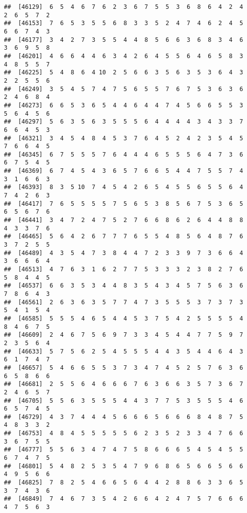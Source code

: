 \documentclass[
]{book}
\begin{document}
\begin{verbatim}
##  [46129]  6  5  4  6  7  6  2  3  6  7  5  5  3  6  8  6  4  2  4  2  6  5  7  2
##  [46153]  7  6  5  3  5  5  6  8  3  3  5  2  4  7  4  6  2  4  5  6  6  7  4  3
##  [46177]  3  4  2  7  3  5  5  4  4  8  5  6  6  3  6  8  3  4  6  3  6  9  5  8
##  [46201]  4  6  6  4  4  6  3  4  2  6  4  5  5  6  4  6  5  8  3  4  8  5  5  7
##  [46225]  5  4  8  6  4 10  2  5  6  6  3  5  6  3  5  3  6  4  3  2  2  5  5  6
##  [46249]  3  5  4  5  7  4  7  5  6  5  5  7  6  7  5  3  6  3  6  2  4  6  8  4
##  [46273]  6  6  5  3  6  5  4  4  6  4  4  7  4  5  6  6  5  5  3  5  6  4  5  6
##  [46297]  5  6  3  5  6  3  5  5  5  6  4  4  4  4  3  4  3  3  7  6  6  4  5  3
##  [46321]  3  4  5  4  8  4  5  3  7  6  4  5  2  4  2  3  5  4  5  7  6  6  4  5
##  [46345]  6  7  5  5  5  7  6  4  4  4  6  5  5  5  6  4  7  3  6  6  7  5  4  5
##  [46369]  6  7  4  5  4  3  6  5  7  6  6  5  4  4  7  5  5  7  4  3  1  6  6  3
##  [46393]  8  3  5 10  7  4  5  4  2  6  5  4  5  5  6  5  5  6  4  7  4  2  6  3
##  [46417]  7  6  5  5  5  5  7  5  6  5  3  8  5  6  7  5  3  6  5  6  5  6  7  6
##  [46441]  3  4  7  2  4  7  5  2  7  6  6  8  6  2  6  4  4  8  8  4  3  3  7  6
##  [46465]  5  6  4  2  6  7  7  7  6  5  5  4  8  5  6  4  8  7  6  3  7  2  5  5
##  [46489]  4  3  5  4  7  3  8  4  4  7  2  3  3  9  7  3  6  6  4  3  6  6  6  4
##  [46513]  4  7  6  3  1  6  2  7  7  5  3  3  3  2  3  8  2  7  6  5  8  4  4  5
##  [46537]  6  6  3  5  3  4  4  8  3  5  4  3  4  5  7  5  6  3  6  7  8  6  4  3
##  [46561]  2  6  3  6  3  5  7  7  4  7  3  5  5  5  3  7  3  7  3  5  4  1  5  4
##  [46585]  5  5  5  4  6  5  4  4  5  3  7  5  4  2  5  5  5  5  4  8  4  6  7  5
##  [46609]  2  4  6  7  5  6  9  7  3  3  4  5  4  4  7  7  5  9  7  2  3  5  6  4
##  [46633]  5  7  5  6  2  5  4  5  5  5  4  4  3  5  4  4  6  4  3  6  1  7  4  7
##  [46657]  5  4  6  6  5  5  3  7  3  4  7  4  5  2  5  7  6  3  6  6  5  8  6  6
##  [46681]  2  5  5  6  4  6  6  6  7  6  3  6  6  3  5  7  3  6  7  2  4  6  5  7
##  [46705]  5  5  6  3  5  5  5  4  4  3  7  7  5  3  5  5  5  4  6  6  5  7  4  5
##  [46729]  4  3  7  4  4  4  5  6  6  6  5  6  6  6  8  4  8  7  5  4  8  3  3  2
##  [46753]  4  8  4  5  5  5  5  5  6  2  3  5  2  3  3  4  7  6  6  3  6  7  5  5
##  [46777]  5  5  6  3  4  7  4  7  5  8  6  6  6  5  4  5  4  5  5  6  7  4  7  5
##  [46801]  5  4  8  2  5  3  5  4  7  9  6  8  6  5  6  6  5  6  6  4  9  5  6  6
##  [46825]  7  8  2  5  4  6  6  5  6  4  4  2  8  8  6  3  3  6  5  3  7  4  3  6
##  [46849]  7  4  6  7  3  5  4  2  6  6  4  2  4  7  5  7  6  6  6  4  7  5  6  3

\end{verbatim}
\end{document}
